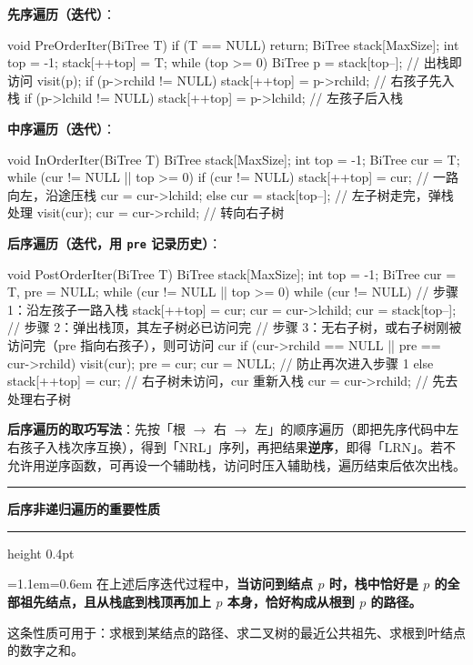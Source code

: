 \documentclass[11pt,openany,UTF8]{ctexbook}
\newcommand{\callouthead}[2]{%
  \par\addvspace{7pt}\noindent
  {\color{#1}\rule[-0.15em]{3pt}{1.05em}}\hspace{0.5em}%
  {\bfseries\color{#1}#2}\par\nobreak\vspace{-0.35em}%
  {\color{rulesep}\hrule height 0.4pt}\nobreak\vspace{0.45em}%
  \begingroup\small\setlength{\parindent}{0pt}%
  \leftskip=1.1em\rightskip=0.6em\noindent\ignorespaces}
\newcommand{\calloutend}{\par\endgroup\addvspace{7pt}}
\newenvironment{callkey}[1]{\callouthead{keybar}{#1}}{\calloutend}
\begin{document}
\textbf{先序遍历（迭代）}：

\begin{codebox}
void PreOrderIter(BiTree T) {
    if (T == NULL) return;
    BiTree stack[MaxSize];
    int top = -1;
    stack[++top] = T;
    while (top >= 0) {
        BiTree p = stack[top--];   // 出栈即访问
        visit(p);
        if (p->rchild != NULL) stack[++top] = p->rchild; // 右孩子先入栈
        if (p->lchild != NULL) stack[++top] = p->lchild; // 左孩子后入栈
    }
}
\end{codebox}

\textbf{中序遍历（迭代）}：

\begin{codebox}
void InOrderIter(BiTree T) {
    BiTree stack[MaxSize];
    int top = -1;
    BiTree cur = T;
    while (cur != NULL || top >= 0) {
        if (cur != NULL) {
            stack[++top] = cur;     // 一路向左，沿途压栈
            cur = cur->lchild;
        } else {
            cur = stack[top--];     // 左子树走完，弹栈处理
            visit(cur);
            cur = cur->rchild;      // 转向右子树
        }
    }
}
\end{codebox}

\textbf{后序遍历（迭代，用 \texttt{pre} 记录历史）}：

\begin{codebox}
void PostOrderIter(BiTree T) {
    BiTree stack[MaxSize];
    int top = -1;
    BiTree cur = T, pre = NULL;
    while (cur != NULL || top >= 0) {
        while (cur != NULL) {          // 步骤 1：沿左孩子一路入栈
            stack[++top] = cur;
            cur = cur->lchild;
        }
        cur = stack[top--];            // 步骤 2：弹出栈顶，其左子树必已访问完
        // 步骤 3：无右子树，或右子树刚被访问完（pre 指向右孩子），则可访问 cur
        if (cur->rchild == NULL || pre == cur->rchild) {
            visit(cur);
            pre = cur;
            cur = NULL;                // 防止再次进入步骤 1
        } else {
            stack[++top] = cur;        // 右子树未访问，cur 重新入栈
            cur = cur->rchild;         // 先去处理右子树
        }
    }
}
\end{codebox}

\textbf{后序遍历的取巧写法}：先按「根 $\to$ 右 $\to$ 左」的顺序遍历（即把先序代码中左右孩子入栈次序互换），得到「NRL」序列，再把结果\textbf{逆序}，即得「LRN」。若不允许用逆序函数，可再设一个辅助栈，访问时压入辅助栈，遍历结束后依次出栈。

\begin{callkey}{后序非递归遍历的重要性质}
在上述后序迭代过程中，\textbf{当访问到结点 $p$ 时，栈中恰好是 $p$ 的全部祖先结点，且从栈底到栈顶再加上 $p$ 本身，恰好构成从根到 $p$ 的路径。}

这条性质可用于：求根到某结点的路径、求二叉树的最近公共祖先、求根到叶结点的数字之和。

\end{callkey}
\end{document}
